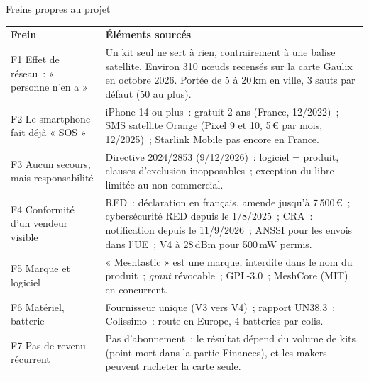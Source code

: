 \begin{frame}{Freins propres au projet}
  \footnotesize\renewcommand{\arraystretch}{1.0}
  \begin{tabularx}{\linewidth}{@{}>{\raggedright\arraybackslash}p{2.9cm}X@{}}
    \rowcolor{insarose}\textcolor{insarouge}{\bfseries Frein} & \textcolor{insarouge}{\bfseries Éléments sourcés}\\
    F1 Effet de réseau~: « personne n'en a » & Un kit seul ne sert à rien, contrairement à une balise satellite. Environ 310 nœuds recensés sur la carte Gaulix en octobre 2026. Portée de 5 à 20\,km en ville, 3 sauts par défaut (50 au plus).\\
    F2 Le smartphone fait déjà « SOS » & iPhone 14 ou plus~: gratuit 2 ans (France, 12/2022)~; SMS satellite Orange (Pixel 9 et 10, 5\,€ par mois, 12/2025)~; Starlink Mobile pas encore en France.\\
    F3 Aucun secours, mais responsabilité & Directive 2024/2853 (9/12/2026)~: logiciel = produit, clauses d'exclusion inopposables~; exception du libre limitée au non commercial.\\
    F4 Conformité d'un vendeur visible & RED~: déclaration en français, amende jusqu'à 7\,500\,€~; cybersécurité RED depuis le 1/8/2025~; CRA~: notification depuis le 11/9/2026~; ANSSI pour les envois dans l'UE~; V4 à 28\,dBm pour 500\,mW permis.\\
    F5 Marque et logiciel & « Meshtastic » est une marque, interdite dans le nom du produit~; \emph{grant} révocable~; GPL-3.0~; MeshCore (MIT) en concurrent.\\
    F6 Matériel, batterie & Fournisseur unique (V3 vers V4)~; rapport UN38.3~; Colissimo~: route en Europe, 4 batteries par colis.\\
    F7 Pas de revenu récurrent & Pas d'abonnement~: le résultat dépend du volume de kits (point mort dans la partie Finances), et les makers peuvent racheter la carte seule.\\
  \end{tabularx}
\end{frame}


